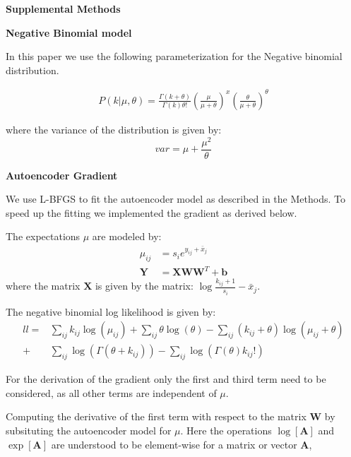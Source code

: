 \documentclass[11pt]{letter}
\newcommand{\matr}[1]{\mathbf{#1}}
\begin{document}
\textbf{Supplemental Methods}

\textbf{Negative Binomial model}

In this paper we use the following parameterization for the Negative binomial distribution.

\begin{align*}
P(k| \mu, \theta) = \frac{\Gamma(k + \theta)}{\Gamma(k) \theta!}  
\left ( \frac{\mu}{\mu + \theta} \right )^{x}
\left ( \frac{\theta}{\mu + \theta} \right)^{\theta} 
\end{align*}

where the variance of the distribution is given by:
\[
var = \mu + \frac{\mu^2}{\theta}
\]

\textbf{Autoencoder Gradient}

We use L-BFGS to fit the autoencoder model as described in the Methods.
To speed up the fitting we implemented the gradient as derived below.

The expectations $\mu$ are modeled by:
\begin{align*}
\mu_{ij} &= s_{i} e^{y_{ij} + \bar{x}_j}\\
\matr{Y} &= \matr{X} \matr{W} \matr{W}^T + \matr{b}
\end{align*}
where the matrix $\matr{X}$ is given by the matrix: $\log{\frac{k_{ij}+1}{s_i}} - \bar{x}_j$. 

The negative binomial log likelihood is given by:
\begin{align*}
ll=& \sum_{ij} k_{ij} \log{(\mu_{ij})} + 
\sum_{ij} \theta \log{(\theta)} -
\sum_{ij} (k_{ij} + \theta) \log{(\mu_{ij} + \theta)} \\
+&\sum_{ij} \log{(\Gamma(\theta + k_{ij}))} 
- \sum_{ij} \log{(\Gamma({\theta}) k_{ij}!)}
\end{align*}

For the derivation of the gradient only the first and third term need to be considered, 
as all other terms are independent of $\mu$.

Computing the derivative of the first term with respect to the matrix $\matr{W}$ by subsituting the autoencoder model for $\mu$. 
Here the operations $\log[\matr{A}]$ and $\exp[\matr{A}]$ are understood to be element-wise for a matrix or vector $\matr{A}$,
\end{document}
